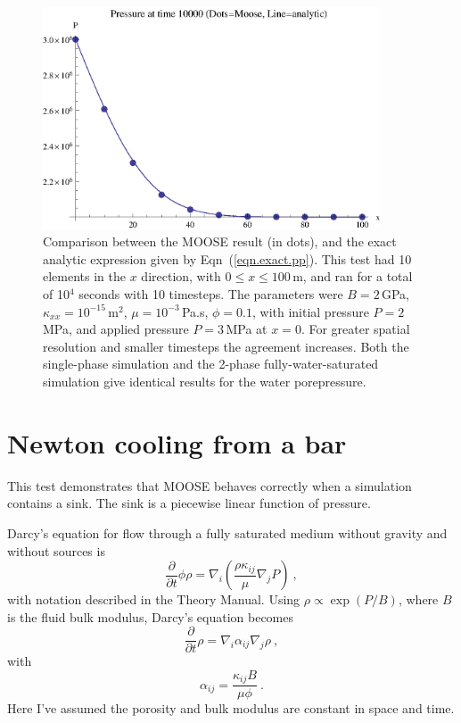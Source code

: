 \documentclass[]{scrreprt}
\begin{document}
\begin{figure}[htb]
\centering
\includegraphics[width=10cm]{pressure_pulse.eps}
\caption{Comparison between the MOOSE result (in dots), and the
  exact analytic expression given by Eqn~(\ref{eqn.exact.pp}).  This
  test had 10 elements in the $x$ direction, with $0\leq x \leq
  100$\,m, and ran for a total of 
  10$^4$ seconds with 10 timesteps.  The parameters were $B=2$\,GPa,
  $\kappa_{xx}=10^{-15}$\,m$^{2}$, $\mu=10^{-3}$\,Pa.s, $\phi=0.1$,
  with initial pressure $P=2$\,MPa, and applied pressure $P=3$\,MPa at
  $x=0$.  For greater spatial resolution and smaller timesteps the
  agreement increases.  Both the single-phase simulation and the
  2-phase fully-water-saturated simulation give identical results for
  the water porepressure.}
\label{pressure_pulse.fig}
\end{figure}



\chapter{Newton cooling from a bar}
\label{nc}

This test demonstrates that MOOSE behaves correctly when a simulation
contains a sink.  The sink is a piecewise linear function of pressure.

Darcy's equation for flow through a fully saturated medium without
gravity and without sources is 
\begin{equation}
\frac{\partial}{\partial t}\phi\rho = \nabla_{i}\left(\frac{\rho
  \kappa_{ij}}{\mu} \nabla_{j}P \right) \ ,
\end{equation}
with notation described in the Theory Manual.  Using $\rho \propto
\exp(P/B)$, where $B$ is the fluid bulk modulus, Darcy's equation
becomes
\begin{equation}
\frac{\partial}{\partial t}\rho = \nabla_{i}\alpha_{ij}\nabla_{j}\rho \ ,
\end{equation}
with 
\begin{equation}
\alpha_{ij} = \frac{\kappa_{ij}B}{\mu\phi} \ .
\end{equation}
Here I've assumed the porosity and bulk modulus are constant in space
and time.
\end{document}
